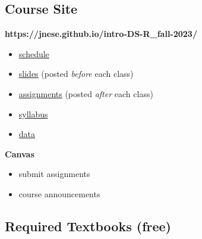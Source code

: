 \documentclass[
  letterpaper,
  DIV=11,
  numbers=noendperiod,
  oneside]{scrartcl}
\providecommand{\tightlist}{%
  \setlength{\itemsep}{0pt}\setlength{\parskip}{0pt}}\usepackage{longtable,booktabs,array}
\begin{document}
\hypertarget{course-site}{%
\subsection{Course Site}\label{course-site}}

\textbf{https://jnese.github.io/intro-DS-R\_fall-2023/}

\begin{itemize}
\tightlist
\item
  \href{https://jnese.github.io/intro-DS-R_fall-2023/}{schedule}
\item
  \href{https://jnese.github.io/intro-DS-R_fall-2023/}{slides} (posted
  \emph{before} each class)
\item
  \href{https://jnese.github.io/intro-DS-R_fall-2023/assignments.html}{assignments}
  (posted \emph{after} each class)
\item
  \href{https://jnese.github.io/intro-DS-R_fall-2023/syllabus.html}{syllabus}
\item
  \href{https://jnese.github.io/intro-DS-R_fall-2023/data_list.html}{data}
\end{itemize}

\textbf{Canvas}

\begin{itemize}
\tightlist
\item
  submit assignments
\item
  course announcements
\end{itemize}

\hypertarget{required-textbooks-free}{%
\subsection{Required Textbooks (free)}\label{required-textbooks-free}}
\end{document}

